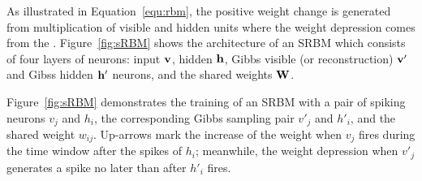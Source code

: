 As illustrated in Equation~\ref{equ:rbm}, the positive weight change is generated from multiplication of visible and hidden units where the weight depression comes from the \DIFdelbegin {}\DIFdelend \DIFaddbegin {}\DIFaddend .
Figure~\ref{fig:sRBM} shows the architecture of an SRBM which consists of four layers of neurons: input $\bf{v}$, hidden $\bf{h}$, Gibbs visible (or reconstruction) $\bf{v'}$ and Gibss hidden $\bf{h'}$ neurons, and the shared weights $\bf{W}$.

Figure~\ref{fig:sRBM} demonstrates the training of an SRBM with a pair of spiking neurons $v_j$ and $h_i$, the corresponding Gibbs sampling pair $v'_j$ and $h'_i$, and the shared weight $w_{ij}$.
Up-arrows mark the increase of the weight when $v_j$ fires during the time window after the spikes of $h_i$;
meanwhile, \DIFdelbegin {}\DIFdelend \DIFaddbegin {}\DIFaddend the weight depression when $v'_j$ generates a spike no later than \DIFdelbegin {}\DIFdelend \DIFaddbegin {}\DIFaddend after $h'_i$ fires.





